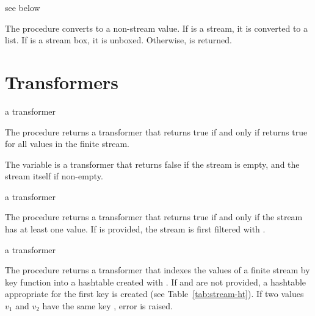 \begin{procedure}
\end{procedure}
\returns{} see below

The  procedure converts  to a non-stream value. If  is a
stream, it is converted to a list. If  is a stream box, it is unboxed. Otherwise,
 is returned.

\section {Transformers}

\begin{procedure}
\end{procedure}
\returns{} a transformer

The  procedure returns a transformer that returns true if and only if
 returns true for all values in the finite stream.

\begin{variable}
\end{variable}
\antipar

The  variable is a transformer that returns false if the stream is empty, and
the stream itself if non-empty.

\begin{procedure}
\end{procedure}
\returns{} a transformer

The  procedure returns a transformer that returns true if and only if the
stream has at least one value. If  is provided, the stream is first
filtered with .

\begin{procedure}
\end{procedure}
\returns{} a transformer

The  procedure returns a transformer that indexes the values of a finite
stream by key function  into a hashtable created with . If  and  are not provided, a hashtable
appropriate for the first key is created (see Table~\ref{tab:stream-ht}). If two values
$v_1$ and $v_2$ have the same key , error  is raised.

